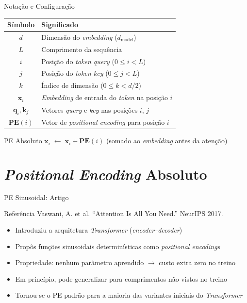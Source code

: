 \documentclass[aspectratio=169, xcolor=dvipsnames]{beamer}
\begin{document}
  \begin{frame}{Notação e Configuração}
    \centering
    \begin{tabular}{cl}
      \toprule
      \textbf{Símbolo} & \textbf{Significado} \\
      \midrule
      $d$ & Dimensão do \textit{embedding} ($d_{\text{model}}$) \\
      $L$ & Comprimento da sequência \\
      $i$ & Posição do \textit{token query} ($0 \le i < L$) \\
      $j$ & Posição do \textit{token key} ($0 \le j < L$) \\
      $k$ & Índice de dimensão ($0 \le k < d/2$) \\
      $\mathbf{x}_i$ & \textit{Embedding} de entrada do \textit{token} na posição $i$ \\
      $\mathbf{q}_i, \mathbf{k}_j$ & Vetores \textit{query} e \textit{key} nas posições $i$, $j$ \\
      $\mathbf{PE}(i)$ & Vetor de \textit{positional encoding} para posição $i$ \\
      \bottomrule
    \end{tabular}

    \vspace{0.5em}
    \begin{block}{PE Absoluto}
      $\mathbf{x}_i \;\leftarrow\; \mathbf{x}_i + \mathbf{PE}(i)$ \quad (somado ao \textit{embedding} antes da atenção)
    \end{block}
  \end{frame}

  \section{\textit{Positional Encoding} Absoluto}

  \begin{frame}{PE Sinusoidal: Artigo}
    \begin{block}{Referência}
      Vaswani, A. et al. ``Attention Is All You Need.'' NeurIPS 2017.
    \end{block}
    \begin{itemize}
      \item Introduziu a arquitetura \textit{Transformer} (\textit{encoder--decoder})
      \item Propôs funções sinusoidais determinísticas como \textit{positional encodings}
      \item Propriedade: nenhum parâmetro aprendido $\to$ custo extra zero no treino
      \item Em princípio, pode generalizar para comprimentos não vistos no treino
      \item Tornou-se o PE padrão para a maioria das variantes iniciais do \textit{Transformer}
    \end{itemize}
  \end{frame}
\end{document}
